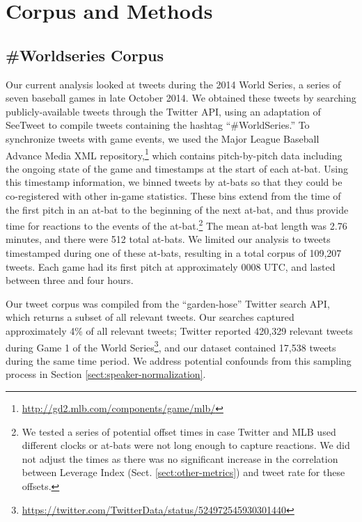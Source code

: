 \documentclass[11pt,letterpaper]{article}
\begin{document}
%

\section{Corpus and Methods}

\subsection{\#Worldseries Corpus}

Our current analysis looked at tweets during the 2014 World Series, a series of seven baseball games in late October 2014.  We obtained these tweets by searching publicly-available tweets through the Twitter API, using an adaptation of SeeTweet \cite{doyle2014} to compile tweets containing the hashtag ``\#WorldSeries.''  To synchronize tweets with game events, we used the Major League Baseball Advance Media XML repository,\footnote{\url{http://gd2.mlb.com/components/game/mlb/}} which contains pitch-by-pitch data including the ongoing state of the game and timestamps at the start of each at-bat. Using this timestamp information, we binned tweets by at-bats so that they could be co-registered with other in-game statistics.  These bins extend from the time of the first pitch in an at-bat to the beginning of the next at-bat, and thus provide time for reactions to the events of the at-bat.\footnote{We tested a series of potential offset times in case Twitter and MLB used different clocks or at-bats were not long enough to capture reactions. We did not adjust the times as there was no significant increase in the correlation between Leverage Index (Sect. \ref{sect:other-metrics}) and tweet rate for these offsets.}  The mean at-bat length was 2.76 minutes, and there were 512 total at-bats.  We limited our analysis to tweets timestamped during one of these at-bats, resulting in a total corpus of 109,207 tweets. Each game had its first pitch at approximately 0008 UTC, and lasted between three and four hours.

Our tweet corpus was compiled from the ``garden-hose'' Twitter search API, which returns a subset of all relevant tweets. Our searches captured approximately 4\% of all relevant tweets; Twitter reported 420,329 relevant tweets during Game 1 of the World Series\footnote{\url{https://twitter.com/TwitterData/status/524972545930301440}}, and our dataset contained 17,538 tweets during the same time period.  We address potential confounds from this sampling process in Section \ref{sect:speaker-normalization}.
\end{document}
